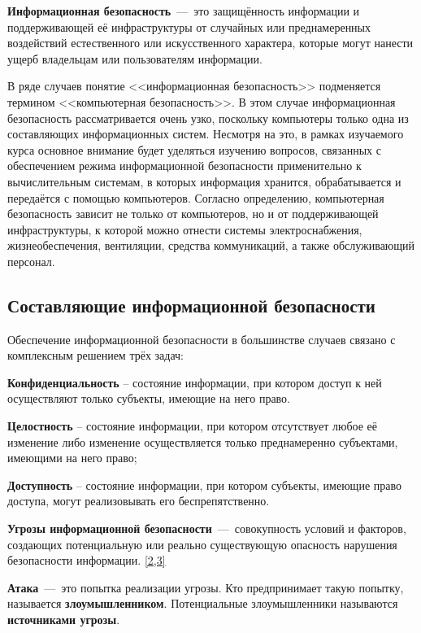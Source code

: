 \textbf{Информационная безопасность}~---~это защищённость информации и
поддерживающей её инфраструктуры от случайных или преднамеренных воздействий
естественного или искусственного характера, которые могут нанести ущерб
владельцам или пользователям информации.

В ряде случаев понятие <<информационная безопасность>> подменяется термином
<<компьютерная безопасность>>. В этом случае информационная безопасность
рассматривается очень узко, поскольку компьютеры только одна из составляющих
информационных систем. Несмотря на это, в рамках изучаемого курса основное
внимание будет уделяться изучению вопросов, связанных с обеспечением режима
информационной безопасности применительно к вычислительным системам, в
которых информация хранится, обрабатывается и передаётся с помощью
компьютеров. Согласно определению, компьютерная безопасность зависит не
только от компьютеров, но и от поддерживающей инфраструктуры, к которой можно
отнести системы электроснабжения, жизнеобеспечения, вентиляции, средства
коммуникаций, а также обслуживающий персонал.


\subsection{Составляющие информационной безопасности}%
Обеспечение информационной безопасности в большинстве случаев связано с
комплексным решением трёх задач:
\begin{Notes}
  \item \textbf{Конфиденциальность} – состояние информации, при котором
      доступ к ней осуществляют только субъекты, имеющие на него право.
  \item \textbf{Целостность} – состояние информации, при котором
      отсутствует любое её изменение либо изменение осуществляется только
      преднамеренно субъектами, имеющими на него право;
  \item \textbf{Доступность} – состояние информации, при котором субъекты,
      имеющие право доступа, могут реализовывать его беспрепятственно.
\end{Notes}

\textbf{Угрозы информационной безопасности}~---~совокупность условий и
факторов, создающих потенциальную или реально существующую опасность
нарушения безопасности информации.
\href{https://www.intuit.ru/studies/courses/697/553/literature#literature.1}{[2,3]}

\textbf{Атака}~---~это попытка реализации угрозы. Кто предпринимает такую
попытку, называется \textbf{злоумышленником}. Потенциальные злоумышленники
называются \textbf{источниками угрозы}.

